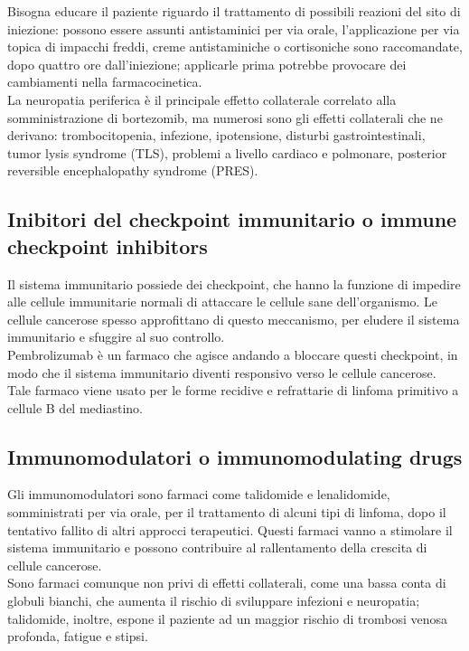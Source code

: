 Bisogna educare il paziente riguardo il trattamento di possibili reazioni del sito di iniezione: 
possono essere assunti antistaminici per via orale, l’applicazione per via topica di impacchi freddi, 
creme antistaminiche o cortisoniche sono raccomandate, dopo quattro ore dall’iniezione;
applicarle prima potrebbe provocare dei cambiamenti nella farmacocinetica\cite{BORTEZOMIB}.\\
La neuropatia periferica è il principale effetto collaterale correlato alla somministrazione di bortezomib, 
ma numerosi sono gli effetti collaterali che ne derivano: trombocitopenia, infezione, ipotensione, disturbi 
gastrointestinali, tumor lysis syndrome (TLS), problemi a livello cardiaco e polmonare, posterior reversible 
encephalopathy syndrome (PRES)\cite{BORTNURSES}.

\subsection{Inibitori del checkpoint immunitario o immune checkpoint inhibitors}

Il sistema immunitario possiede dei checkpoint, che hanno la funzione di impedire alle cellule immunitarie normali di 
attaccare le cellule sane dell’organismo. Le cellule cancerose spesso approfittano di questo meccanismo, per eludere il 
sistema immunitario e sfuggire al suo controllo.\\ 
Pembrolizumab è un farmaco che agisce andando a bloccare questi checkpoint, in modo che il sistema immunitario 
diventi responsivo verso le cellule cancerose. Tale farmaco viene usato per le forme recidive e refrattarie di linfoma 
primitivo a cellule B del mediastino\cite{IMMUNOTP}.

\subsection{Immunomodulatori o immunomodulating drugs}

Gli immunomodulatori sono farmaci come talidomide e lenalidomide, somministrati per via orale, per il trattamento di 
alcuni tipi di linfoma, dopo il tentativo fallito di altri approcci terapeutici\cite{MASSIVEBIO}.
Questi farmaci vanno a stimolare il sistema immunitario e possono contribuire al rallentamento della crescita di 
cellule cancerose.\\
Sono farmaci comunque non privi di effetti collaterali, come una bassa conta di globuli bianchi, che aumenta il 
rischio di sviluppare infezioni e neuropatia; talidomide, inoltre, espone il paziente ad un maggior rischio di trombosi 
venosa profonda, fatigue e stipsi\cite{IMMUNOTP}.

